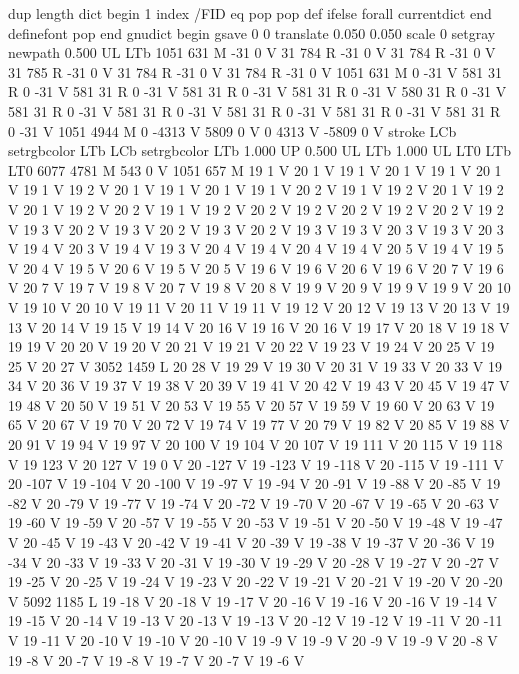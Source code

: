{{{{{dup length dict begin {1 index /FID eq {pop pop} {def} ifelse} forall
currentdict end definefont pop
end
gnudict begin
gsave
0 0 translate
0.050 0.050 scale
0 setgray
newpath
0.500 UL
LTb
1051 631 M
-31 0 V
31 784 R
-31 0 V
31 784 R
-31 0 V
31 785 R
-31 0 V
31 784 R
-31 0 V
31 784 R
-31 0 V
1051 631 M
0 -31 V
581 31 R
0 -31 V
581 31 R
0 -31 V
581 31 R
0 -31 V
581 31 R
0 -31 V
580 31 R
0 -31 V
581 31 R
0 -31 V
581 31 R
0 -31 V
581 31 R
0 -31 V
581 31 R
0 -31 V
581 31 R
0 -31 V
1051 4944 M
0 -4313 V
5809 0 V
0 4313 V
-5809 0 V
stroke
LCb setrgbcolor
LTb
LCb setrgbcolor
LTb
1.000 UP
0.500 UL
LTb
1.000 UL
LT0
LTb
LT0
6077 4781 M
543 0 V
1051 657 M
19 1 V
20 1 V
19 1 V
20 1 V
19 1 V
20 1 V
19 1 V
19 2 V
20 1 V
19 1 V
20 1 V
19 1 V
20 2 V
19 1 V
19 2 V
20 1 V
19 2 V
20 1 V
19 2 V
20 2 V
19 1 V
19 2 V
20 2 V
19 2 V
20 2 V
19 2 V
20 2 V
19 2 V
19 3 V
20 2 V
19 3 V
20 2 V
19 3 V
20 2 V
19 3 V
19 3 V
20 3 V
19 3 V
20 3 V
19 4 V
20 3 V
19 4 V
19 3 V
20 4 V
19 4 V
20 4 V
19 4 V
20 5 V
19 4 V
19 5 V
20 4 V
19 5 V
20 6 V
19 5 V
20 5 V
19 6 V
19 6 V
20 6 V
19 6 V
20 7 V
19 6 V
20 7 V
19 7 V
19 8 V
20 7 V
19 8 V
20 8 V
19 9 V
20 9 V
19 9 V
19 9 V
20 10 V
19 10 V
20 10 V
19 11 V
20 11 V
19 11 V
19 12 V
20 12 V
19 13 V
20 13 V
19 13 V
20 14 V
19 15 V
19 14 V
20 16 V
19 16 V
20 16 V
19 17 V
20 18 V
19 18 V
19 19 V
20 20 V
19 20 V
20 21 V
19 21 V
20 22 V
19 23 V
19 24 V
20 25 V
19 25 V
20 27 V
3052 1459 L
20 28 V
19 29 V
19 30 V
20 31 V
19 33 V
20 33 V
19 34 V
20 36 V
19 37 V
19 38 V
20 39 V
19 41 V
20 42 V
19 43 V
20 45 V
19 47 V
19 48 V
20 50 V
19 51 V
20 53 V
19 55 V
20 57 V
19 59 V
19 60 V
20 63 V
19 65 V
20 67 V
19 70 V
20 72 V
19 74 V
19 77 V
20 79 V
19 82 V
20 85 V
19 88 V
20 91 V
19 94 V
19 97 V
20 100 V
19 104 V
20 107 V
19 111 V
20 115 V
19 118 V
19 123 V
20 127 V
19 0 V
20 -127 V
19 -123 V
19 -118 V
20 -115 V
19 -111 V
20 -107 V
19 -104 V
20 -100 V
19 -97 V
19 -94 V
20 -91 V
19 -88 V
20 -85 V
19 -82 V
20 -79 V
19 -77 V
19 -74 V
20 -72 V
19 -70 V
20 -67 V
19 -65 V
20 -63 V
19 -60 V
19 -59 V
20 -57 V
19 -55 V
20 -53 V
19 -51 V
20 -50 V
19 -48 V
19 -47 V
20 -45 V
19 -43 V
20 -42 V
19 -41 V
20 -39 V
19 -38 V
19 -37 V
20 -36 V
19 -34 V
20 -33 V
19 -33 V
20 -31 V
19 -30 V
19 -29 V
20 -28 V
19 -27 V
20 -27 V
19 -25 V
20 -25 V
19 -24 V
19 -23 V
20 -22 V
19 -21 V
20 -21 V
19 -20 V
20 -20 V
5092 1185 L
19 -18 V
20 -18 V
19 -17 V
20 -16 V
19 -16 V
20 -16 V
19 -14 V
19 -15 V
20 -14 V
19 -13 V
20 -13 V
19 -13 V
20 -12 V
19 -12 V
19 -11 V
20 -11 V
19 -11 V
20 -10 V
19 -10 V
20 -10 V
19 -9 V
19 -9 V
20 -9 V
19 -9 V
20 -8 V
19 -8 V
20 -7 V
19 -8 V
19 -7 V
20 -7 V
19 -6 V
}}}}}
